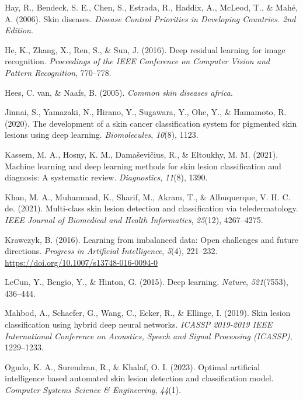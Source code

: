 \documentclass[
  12pt,
  oneside]{article}
\newlength{\cslhangindent}
\newenvironment{CSLReferences}[2] %
 {\begin{list}{}{%
  \setlength{\itemindent}{0pt}
  \setlength{\leftmargin}{0pt}
  \setlength{\parsep}{0pt}
  \ifodd #1
   \setlength{\leftmargin}{\cslhangindent}
   \setlength{\itemindent}{-1\cslhangindent}
  \fi
  \setlength{\itemsep}{#2\baselineskip}}}
 {\end{list}}
\begin{document}
\begin{CSLReferences}{1}{0}
Hay, R., Bendeck, S. E., Chen, S., Estrada, R., Haddix, A., McLeod, T.,
\& Mahé, A. (2006). Skin diseases. \emph{Disease Control Priorities in
Developing Countries. 2nd Edition}.

He, K., Zhang, X., Ren, S., \& Sun, J. (2016). Deep residual learning
for image recognition. \emph{Proceedings of the IEEE Conference on
Computer Vision and Pattern Recognition}, 770--778.

Hees, C. van, \& Naafs, B. (2005). \emph{Common skin diseases africa}.

Jinnai, S., Yamazaki, N., Hirano, Y., Sugawara, Y., Ohe, Y., \&
Hamamoto, R. (2020). The development of a skin cancer classification
system for pigmented skin lesions using deep learning.
\emph{Biomolecules}, \emph{10}(8), 1123.

Kassem, M. A., Hosny, K. M., Damaševičius, R., \& Eltoukhy, M. M.
(2021). Machine learning and deep learning methods for skin lesion
classification and diagnosis: A systematic review. \emph{Diagnostics},
\emph{11}(8), 1390.

Khan, M. A., Muhammad, K., Sharif, M., Akram, T., \& Albuquerque, V. H.
C. de. (2021). Multi-class skin lesion detection and classification via
teledermatology. \emph{IEEE Journal of Biomedical and Health
Informatics}, \emph{25}(12), 4267--4275.

Krawczyk, B. (2016). Learning from imbalanced data: Open challenges and
future directions. \emph{Progress in Artificial Intelligence},
\emph{5}(4), 221--232. \url{https://doi.org/10.1007/s13748-016-0094-0}

LeCun, Y., Bengio, Y., \& Hinton, G. (2015). Deep learning.
\emph{Nature}, \emph{521}(7553), 436--444.

Mahbod, A., Schaefer, G., Wang, C., Ecker, R., \& Ellinge, I. (2019).
Skin lesion classification using hybrid deep neural networks.
\emph{ICASSP 2019-2019 IEEE International Conference on Acoustics,
Speech and Signal Processing (ICASSP)}, 1229--1233.

Ogudo, K. A., Surendran, R., \& Khalaf, O. I. (2023). Optimal artificial
intelligence based automated skin lesion detection and classification
model. \emph{Computer Systems Science \& Engineering}, \emph{44}(1).


\end{CSLReferences}
\end{document}
